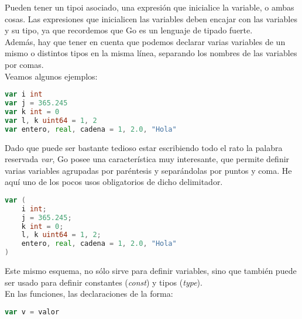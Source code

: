 	Pueden tener un tipoi asociado, una expresión que inicialice la variable, o ambas
	cosas. Las expresiones que inicialicen las variables deben encajar con las
	variables y su tipo, ya que recordemos que Go es un lenguaje de tipado
	fuerte.\\

	Además, hay que tener en cuenta que podemos declarar varias variables de un
	mismo o distintos tipos en la misma línea, separando los nombres de las
	variables por comas.\\

	Veamos algunos ejemplos:

\begin{minipage}{17.1cm}
\begin{lstlisting}[language=go,numbers=none, caption=Declaraciones de variables,
label=declvar]
var i int
var j = 365.245
var k int = 0
var l, k uint64 = 1, 2
var entero, real, cadena = 1, 2.0, "Hola"
\end{lstlisting}
\end{minipage}

	Dado que puede ser bastante tedioso estar escribiendo todo el rato la
	palabra reservada \emph{var}, Go posee una característica muy interesante,
	que permite definir varias variables agrupadas por paréntesis
	y separándolas por puntos y coma. He aquí uno de los pocos usos obligatorios
	de dicho delimitador.

\begin{minipage}{17.1cm}
\begin{lstlisting}[language=go,numbers=none, caption=Declaración de variables agrupadas,
label=declvaragrup]
var (
	i int;
	j = 365.245;
	k int = 0;
	l, k uint64 = 1, 2;
	entero, real, cadena = 1, 2.0, "Hola"
)
\end{lstlisting}
\end{minipage}


	Este mismo esquema, no sólo sirve para definir variables, sino que también
	puede ser usado para definir constantes (\emph{const}) y tipos
	(\emph{type}).\\

	En las funciones, las declaraciones de la forma:

\begin{minipage}{17.1cm}
\begin{lstlisting}[language=go,numbers=none]
var v = valor
\end{lstlisting}
\end{minipage}

